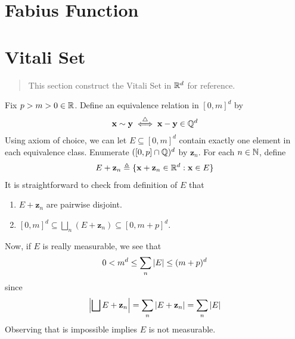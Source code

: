 \documentclass{report}
\begin{document}
\section{Fabius Function}
\section{Vitali Set}
\label{Vitali Set}
\begin{abstract}
This section construct the Vitali Set in $\mathbb{R}^d$ for reference.
\end{abstract}
\begin{mdframed}
Fix $p>m>0\in\mathbb{R}$. Define an equivalence relation in $[0,m]^d$ by 
\begin{align*}
\textbf{x}\sim  \textbf{y}\overset{\triangle}{\iff }\textbf{x}-\textbf{y}\in\mathbb{Q}^d
\end{align*}
Using axiom of choice, we can let $E\subseteq [0,m]^d$ contain exactly one element in each equivalence class. Enumerate $([0,p]\cap \mathbb{Q})^d$ by $\textbf{z}_n$. For each $n\in\mathbb{N}$, define 
\begin{align*}
E+\textbf{z}_n \triangleq \{ \textbf{x}+\textbf{z}_n\in\mathbb{R}^d: \textbf{x}\in E \}
\end{align*}
It is straightforward to check from definition of $E$ that 
\begin{enumerate}[label=(\alph*)]
  \item $E+\textbf{z}_n$ are pairwise disjoint. 
  \item $[0,m]^d \subseteq \bigsqcup_n (E+\textbf{z}_n)\subseteq [0,m+p]^d$. 
\end{enumerate}
Now, if $E$ is really measurable, we see that 
\begin{align}
\label{con}
0<m^d\leq \sum_n \left|E\right|\leq (m+p)^d
\end{align}
since 
\begin{align*}
\left|\bigsqcup  E+\textbf{z}_n\right|= \sum_n \left|E+\textbf{z}_n\right|=\sum_n \left|E\right|
\end{align*}
Observing that  is impossible implies $E$ is not measurable.
\end{mdframed}
\end{document}
